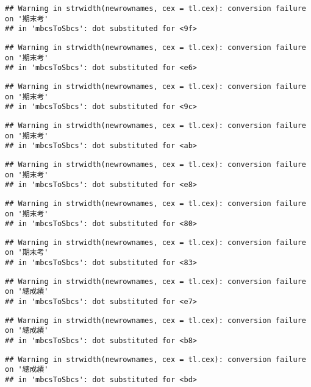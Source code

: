 \documentclass[
]{book}
\begin{document}
\begin{verbatim}
## Warning in strwidth(newrownames, cex = tl.cex): conversion failure on '期末考'
## in 'mbcsToSbcs': dot substituted for <9f>
\end{verbatim}

\begin{verbatim}
## Warning in strwidth(newrownames, cex = tl.cex): conversion failure on '期末考'
## in 'mbcsToSbcs': dot substituted for <e6>
\end{verbatim}

\begin{verbatim}
## Warning in strwidth(newrownames, cex = tl.cex): conversion failure on '期末考'
## in 'mbcsToSbcs': dot substituted for <9c>
\end{verbatim}

\begin{verbatim}
## Warning in strwidth(newrownames, cex = tl.cex): conversion failure on '期末考'
## in 'mbcsToSbcs': dot substituted for <ab>
\end{verbatim}

\begin{verbatim}
## Warning in strwidth(newrownames, cex = tl.cex): conversion failure on '期末考'
## in 'mbcsToSbcs': dot substituted for <e8>
\end{verbatim}

\begin{verbatim}
## Warning in strwidth(newrownames, cex = tl.cex): conversion failure on '期末考'
## in 'mbcsToSbcs': dot substituted for <80>
\end{verbatim}

\begin{verbatim}
## Warning in strwidth(newrownames, cex = tl.cex): conversion failure on '期末考'
## in 'mbcsToSbcs': dot substituted for <83>
\end{verbatim}

\begin{verbatim}
## Warning in strwidth(newrownames, cex = tl.cex): conversion failure on '總成績'
## in 'mbcsToSbcs': dot substituted for <e7>
\end{verbatim}

\begin{verbatim}
## Warning in strwidth(newrownames, cex = tl.cex): conversion failure on '總成績'
## in 'mbcsToSbcs': dot substituted for <b8>
\end{verbatim}

\begin{verbatim}
## Warning in strwidth(newrownames, cex = tl.cex): conversion failure on '總成績'
## in 'mbcsToSbcs': dot substituted for <bd>
\end{verbatim}
\end{document}
